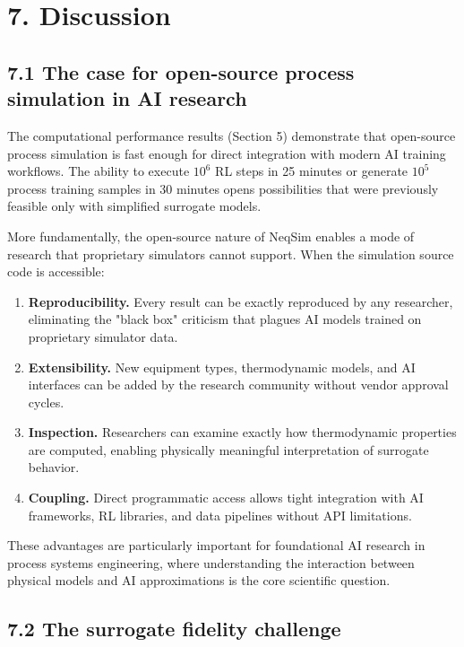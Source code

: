 \documentclass[review,3p]{custom}
\begin{document}
\section{7. Discussion}



\subsection{7.1 The case for open-source process simulation in AI research}

The computational performance results (Section 5) demonstrate that open-source process simulation is fast enough for direct integration with modern AI training workflows. The ability to execute $10^6$ RL steps in 25 minutes or generate $10^5$ process training samples in 30 minutes opens possibilities that were previously feasible only with simplified surrogate models.

More fundamentally, the open-source nature of NeqSim enables a mode of research that proprietary simulators cannot support. When the simulation source code is accessible:

\begin{enumerate}
  \item \textbf{Reproducibility.} Every result can be exactly reproduced by any researcher, eliminating the "black box" criticism that plagues AI models trained on proprietary simulator data.
  \item \textbf{Extensibility.} New equipment types, thermodynamic models, and AI interfaces can be added by the research community without vendor approval cycles.
  \item \textbf{Inspection.} Researchers can examine exactly how thermodynamic properties are computed, enabling physically meaningful interpretation of surrogate behavior.
  \item \textbf{Coupling.} Direct programmatic access allows tight integration with AI frameworks, RL libraries, and data pipelines without API limitations.
\end{enumerate}

These advantages are particularly important for foundational AI research in process systems engineering, where understanding the interaction between physical models and AI approximations is the core scientific question.

\subsection{7.2 The surrogate fidelity challenge}
\end{document}
